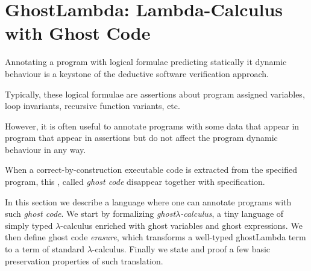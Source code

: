 \section{GhostLambda: Lambda-Calculus with Ghost Code}
Annotating a program with logical formulae predicting statically it dynamic behaviour is a 
keystone of the deductive software verification approach.

Typically, these logical formulae are assertions about program assigned variables,
 loop invariants, recursive function variants, etc. 
 
 However,  it is often useful to annotate programs with some data that appear in program 
  that appear in assertions but do not affect the program dynamic behaviour in any way. 
   
 When a correct-by-construction executable code is extracted
 from the specified program, this , called \textit{ghost code} disappear  together with
 specification. 
 
In this section we describe a language where one can annotate programs with such \textit{ghost code}.
We start by formalizing \textit{ghost}$\lambda$\textit{-calculus}, a tiny language of simply typed $\lambda$-calculus enriched with ghost variables and ghost expressions.
We then define ghost code \textit{erasure}, which transforms a well-typed ghostLambda term  to a term of standard  $\lambda$-calculus.
Finally we state and proof a few basic preservation properties of such translation.



